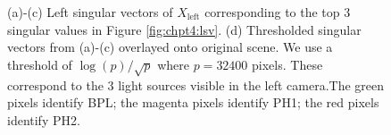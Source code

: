 \begin{figure}
  \begin{center}
    \caption{(a)-(c) Left singular vectors of $X_{\text{left}}$ corresponding to the top 3
      singular values in Figure \ref{fig:chpt4:lsv}. (d) Thresholded singular vectors from
      (a)-(c) overlayed onto original scene. We use a threshold of $\log(p)/\sqrt{p}$
      where $p=32400$ pixels. These correspond to the 3 light sources visible in the left
      camera.The green pixels identify BPL; the magenta pixels identify PH1; the red
      pixels identify PH2.}
    \label{fig:chpt4:flashing_UL}
  \end{center}
\end{figure}

